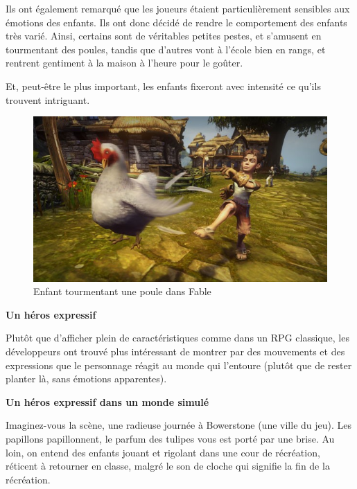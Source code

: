 \documentclass[a4paper, 12pt]{article} %
\begin{document}

Ils ont également remarqué que les joueurs étaient particulièrement sensibles aux émotions des enfants. Ils ont donc décidé de rendre le comportement des enfants très varié. Ainsi, certains sont de véritables petites pestes, et s'amusent en tourmentant des poules, tandis que d’autres vont à l’école bien en rangs, et rentrent gentiment à la maison à l’heure pour le goûter.

Et, peut-être le plus important, les enfants fixeront avec intensité ce qu’ils trouvent intriguant.

\begin{figure}[!h]%
	\begin{center} 
		\includegraphics[width=0.40\columnwidth]{images/chicken.jpg}%
		\caption{Enfant tourmentant une poule dans Fable}%
	\end{center}
\end{figure}

\textbf{Un héros expressif}

Plutôt que d’afficher plein de caractéristiques comme dans un RPG classique, les développeurs ont trouvé plus intéressant de montrer par des mouvements et des expressions que le personnage réagit au monde qui l’entoure (plutôt que de rester planter là, sans émotions apparentes).

\newpage
\textbf{Un héros expressif dans un monde simulé}


Imaginez-vous la scène, une radieuse journée à Bowerstone (une ville du jeu). Les papillons papillonnent, le parfum des tulipes vous est porté par une brise. Au loin, on entend des enfants jouant et rigolant dans une cour de récréation, réticent à retourner en classe, malgré le son de cloche qui signifie la fin de la récréation.
\end{document}
